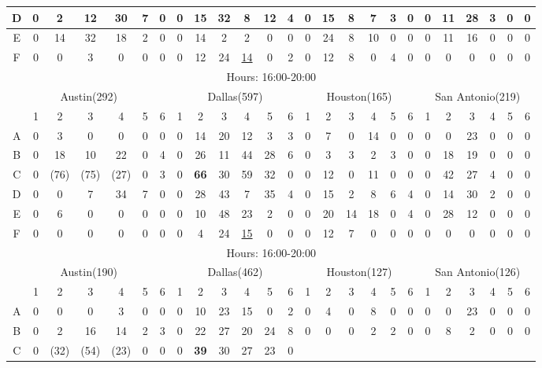 \begin{table*}
\begin{tabular}{|c|c|c|c|c|c|c|c|c|c|c|c|c|c|c|c|c|c|c|c|c|c|c|c|c|}
\hline
D
& 0& 2& 12& 30& 7& 0 
& 0& 15& 32& 8& 12& 4
& 0& 15& 8& 7& 3& 0
& 0& 11& 28& 3& 0& 0 \\
\hline
E
& 0& 14& 32& 18& 2& 0 
& 0& 14& 2& 2& 0& 0 
& 0& 24& 8& 10& 0& 0 
& 0& 11& 16& 0& 0& 0 \\
\hline
F
& 0& 0& 3& 0& 0& 0
& 0& 12& 24& \underline{14}& 0& 2
& 0& 12& 8& 0& 4& 0 
& 0& 0& 0& 0& 0& 0 \\
\hline
\hline	
\multicolumn{25}{|c|}{Hours: 16:00-20:00} 	\\
\hline	
\multicolumn{7}{|c|}{Austin(292)} 	&
\multicolumn{6}{c|}{Dallas(597)} 	&
\multicolumn{6}{c|}{Houston(165)} 	&
\multicolumn{6}{c|}{San Antonio(219)} 	\\
\hline	
\hline	
 & 1 &2 & 3 & 4 & 5&6 	
 & 1 &2 & 3 & 4 & 5&6 	
 & 1 &2 & 3 & 4 & 5&6 	
 & 1 &2 & 3 & 4 & 5&6 \\	
\hline
A
& 0& 3& 0& 0& 0& 0
& 0& 14& 20& 12& 3& 3 
& 0& 7& 0& 14& 0& 0 
& 0& 0& 23& 0& 0& 0 \\
\hline
B
& 0& 18& 10& 22& 0& 4
& 0& 26& 11& 44& 28& 6
& 0& 3& 3& 2& 3& 0
& 0& 18& 19& 0& 0& 0 \\
\hline
C
& 0& (76)& (75)& (27)& 0& 3
& 0& \textbf{66}& 30& 59& 32& 0
& 0& 12& 0& 11& 0& 0
& 0& 42& 27& 4& 0& 0 \\
\hline
D
& 0& 0& 7& 34& 7& 0
& 0& 28& 43& 7& 35& 4
& 0& 15& 2& 8& 6& 4
& 0& 14& 30& 2& 0& 0  \\
\hline
E
& 0& 6& 0& 0& 0& 0
& 0& 10& 48& 23& 2& 0 
& 0& 20& 14& 18& 0& 4 
& 0& 28& 12& 0& 0& 0 \\
\hline
F
& 0& 0& 0& 0& 0& 0 
& 0& 4& 24& \underline{15}& 0& 0 
& 0& 12& 7& 0& 0& 0
& 0& 0& 0& 0& 0& 0 \\
\hline
\hline	
\multicolumn{25}{|c|}{Hours: 16:00-20:00} 	\\
\hline	
\multicolumn{7}{|c|}{Austin(190)} 	&
\multicolumn{6}{c|}{Dallas(462)} 	&
\multicolumn{6}{c|}{Houston(127)} 	&
\multicolumn{6}{c|}{San Antonio(126)} 	\\
\hline	
\hline	
 & 1 &2 & 3 & 4 & 5&6 	
 & 1 &2 & 3 & 4 & 5&6 	
 & 1 &2 & 3 & 4 & 5&6 	
 & 1 &2 & 3 & 4 & 5&6 \\	
\hline
A
& 0& 0& 0& 3& 0& 0
& 0& 10& 23& 15& 0& 2
& 0& 4& 0& 8& 0& 0
& 0& 0& 23& 0& 0& 0 \\
\hline
B
& 0& 2& 16& 14& 2& 3 
& 0& 22& 27& 20& 24& 8
& 0& 0& 0& 2& 2& 0
& 0& 8& 2& 0& 0& 0 \\
\hline
C
& 0& (32)& (54)& (23)& 0& 0 
& 0& \textbf{39}& 30& 27& 23& 0

\end{tabular}
\end{table*}

